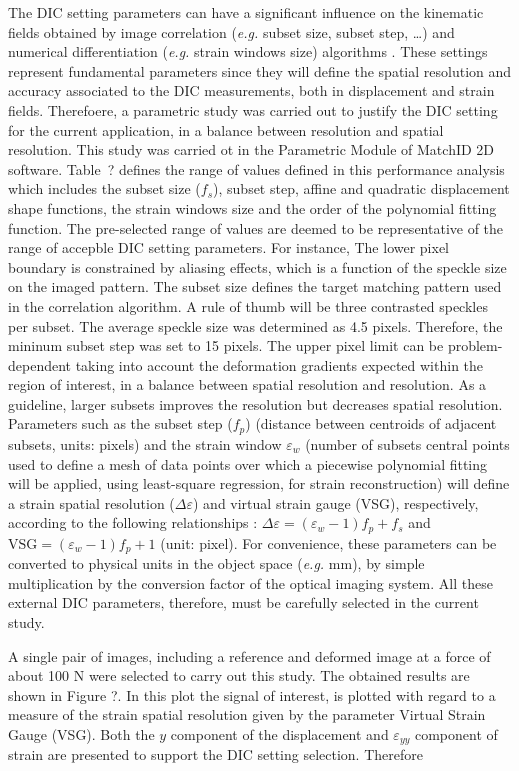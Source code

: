 The DIC setting parameters can have a significant influence on the kinematic fields obtained by image correlation (\textit{e.g.} subset size, subset step, \ldots) and numerical differentiation (\textit{e.g.} strain windows size) algorithms \cite{Pereira2018}. These settings represent fundamental parameters since they will define the spatial resolution and accuracy associated to the DIC measurements, both in displacement and strain fields.  Therefoere, a parametric study was carried out to justify the DIC setting for the current
application, in a balance between resolution and spatial resolution. This study was carried ot in the Parametric Module of MatchID 2D software. Table~? defines the range of values defined in this performance analysis which includes the subset size ($f_s$), subset step, affine and quadratic displacement shape functions, the strain windows size and the order of the polynomial fitting function. The pre-selected range of values are deemed to be representative of the range of accepble DIC setting parameters. For instance, The lower pixel boundary is constrained by aliasing effects, which is a function of the speckle size on the imaged pattern. The subset size defines the target matching pattern used in the correlation algorithm. A rule of thumb will be three contrasted speckles per subset. The average speckle size was determined as 4.5 pixels. Therefore, the mininum subset step was set to 15 pixels. The upper pixel limit can be problem-dependent taking into account the deformation gradients expected within the region of interest, in a balance between spatial resolution and resolution. As a guideline, larger subsets improves the resolution but decreases spatial resolution. Parameters such as the subset step ($f_p$) (distance between centroids of adjacent subsets, units: pixels) and the strain window $\varepsilon_w$ (number of subsets central points used to define a mesh of data points over which a piecewise polynomial fitting will be applied, using least-square regression, for strain reconstruction) will define a strain spatial resolution ($\Delta \varepsilon$) and virtual strain gauge (VSG), respectively, according to the following relationships \cite{Lava2013576,Pereira2018566}: $\Delta \varepsilon = (\varepsilon_w-1)f_p + f_s$ and $\mbox{VSG} = (\varepsilon_w-1)f_p + 1$ (unit: pixel). For convenience, these parameters can be converted to physical units in the object space (\textit{e.g.} mm), by simple multiplication by the conversion factor of the optical imaging system. All these external DIC parameters, therefore, must be carefully selected in the current study.


A single pair of images, including a reference and deformed image at a force of about 100 N were selected to carry out this study. The obtained results are shown in Figure ?. In this plot the signal of interest, is plotted with regard to a measure of the strain spatial resolution given by the parameter Virtual Strain Gauge (VSG). Both the $y$ component of the displacement and $\varepsilon_{yy}$ component of strain are presented to support the DIC setting selection. Therefore


